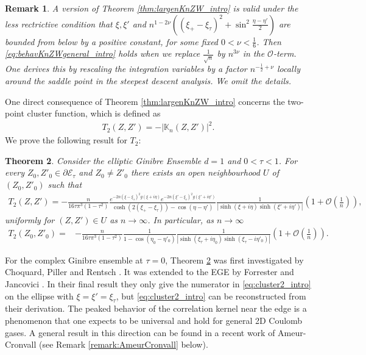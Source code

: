 \documentclass[%
 jmp,
cp,  %
 amsmath,amsthm,amssymb,%
 reprint,%
onecolumn]{revtex4-2}
\newtheorem{theorem}{Theorem}[section]
\newtheorem{remark}[theorem]{Remark}
\begin{document}
    \begin{remark}
    A version of Theorem \ref{thm:largenKnZW_intro} is valid under the less rectrictive condition that $\xi, \xi'$ and $n^{1-2\nu}((\xi_+-\xi_\tau)^2+\sin^2 \frac{\eta-\eta'}{2})$ are bounded from below by a positive constant, for some fixed $0<\nu<\frac{1}{6}$. Then 
     \eqref{eq:behavKnZWgeneral_intro} holds when we replace $\frac{1}{\sqrt n}$ by $n^{3\nu}$ in the $\mathcal O$-term.
     One derives this by rescaling the integration variables by a factor $n^{-\frac{1}{2}+\nu}$ locally around the saddle point in the steepest descent analysis. We omit the details. 
    \end{remark}

    
    One direct consequence  of Theorem \ref{thm:largenKnZW_intro} concerns the two-point cluster function, which is defined as
\begin{align}
T_2(Z,Z') = - \lvert\mathbb K_n(Z,Z')\rvert^2. 
\end{align}
We prove the following result for $T_2$:
\begin{theorem} \label{thm:2ptCluster_intro}
Consider the elliptic Ginibre Ensemble $d=1$ and $0<\tau<1$. 
For every $Z_0, Z'_0\in \partial \mathcal E_\tau$ and $Z_0\neq Z'_0$ there exists an open neighbourhood $U$ of $(Z_0, Z'_0)$ such that
\begin{align} \label{eq:cluster2_intro}
T_2(Z,Z')
= -\frac{n}{16 \tau \pi^3 (1-\tau^2)} \frac{e^{- 2 n (\xi-\xi_\tau)^2 g(\xi+i\eta)} e^{- 2 n (\xi'-\xi_\tau)^2 g(\xi'+i\eta')}}{\cosh (2(\xi_+-\xi_\tau)) - \cos(\eta-\eta')} \frac{1}{|\sinh(\xi+i\eta) \sinh(\xi'+i\eta')|}  \left(1+ \mathcal O\left(\frac{1}{n}\right)\right), 
\end{align}  
uniformly for $(Z,Z') \in U$ as $n\to\infty$. 
In particular, as $n \to \infty$
\begin{align} \label{eq:cluster1_intro}
T_2(Z_0,Z'_0)
=& -\frac{n}{16 \tau \pi^3 (1-\tau^2)} \frac{1}{1-\cos(\eta_0-\eta'_0)} \frac{1}{|\sinh(\xi_\tau+i\eta_0) \sinh(\xi_\tau-i\eta'_0)|}  \left(1+ \mathcal O\left(\frac{1}{n}\right)\right).
\end{align} 

\end{theorem}
For the complex Ginibre ensemble at $\tau=0$, Theorem \ref{thm:2ptCluster_intro} was first investigated by 
Choquard, Piller and Rentsch \cite{Choquard}. It was extended to the EGE by Forrester and Jancovici \cite{FoJa}. In their final result they  only give the numerator in \eqref{eq:cluster2_intro} on the ellipse with $\xi=\xi'=\xi_\tau$, but \eqref{eq:cluster2_intro} can be reconstructed from their derivation.
The peaked behavior of the correlation kernel near the edge is a phenomenon that one expects to be universal and hold for general 2D Coulomb gases.  A general result in this direction can be found in a recent work of Ameur-Cronvall \cite{AmCr} (see Remark \ref{remark:AmeurCronvall} below). 
\end{document}
